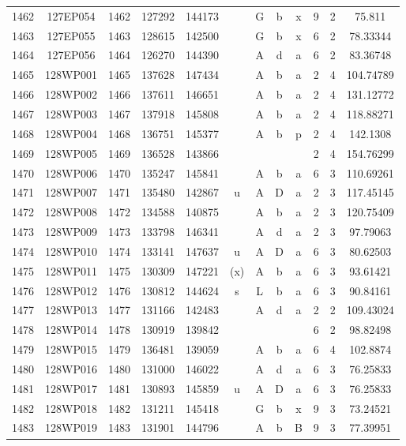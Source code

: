 \begin{tabular}{|*{12}{c|}}
1462 & 127EP054 & 1462 & 127292 & 144173 &  & G & b & x & 9 & 2 & 75.811 \\ 
1463 & 127EP055 & 1463 & 128615 & 142500 &  & G & b & x & 6 & 2 & 78.33344 \\ 
1464 & 127EP056 & 1464 & 126270 & 144390 &  & A & d & a & 6 & 2 & 83.36748 \\ 
1465 & 128WP001 & 1465 & 137628 & 147434 &  & A & b & a & 2 & 4 & 104.74789 \\ 
1466 & 128WP002 & 1466 & 137611 & 146651 &  & A & b & a & 2 & 4 & 131.12772 \\ 
1467 & 128WP003 & 1467 & 137918 & 145808 &  & A & b & a & 2 & 4 & 118.88271 \\ 
1468 & 128WP004 & 1468 & 136751 & 145377 &  & A & b & p & 2 & 4 & 142.1308 \\ 
1469 & 128WP005 & 1469 & 136528 & 143866 &  &  &  &  & 2 & 4 & 154.76299 \\ 
1470 & 128WP006 & 1470 & 135247 & 145841 &  & A & b & a & 6 & 3 & 110.69261 \\ 
1471 & 128WP007 & 1471 & 135480 & 142867 & u & A & D & a & 2 & 3 & 117.45145 \\ 
1472 & 128WP008 & 1472 & 134588 & 140875 &  & A & b & a & 2 & 3 & 120.75409 \\ 
1473 & 128WP009 & 1473 & 133798 & 146341 &  & A & d & a & 2 & 3 & 97.79063 \\ 
1474 & 128WP010 & 1474 & 133141 & 147637 & u & A & D & a & 6 & 3 & 80.62503 \\ 
1475 & 128WP011 & 1475 & 130309 & 147221 & (x) & A & b & a & 6 & 3 & 93.61421 \\ 
1476 & 128WP012 & 1476 & 130812 & 144624 & s & L & b & a & 6 & 3 & 90.84161 \\ 
1477 & 128WP013 & 1477 & 131166 & 142483 &  & A & d & a & 2 & 2 & 109.43024 \\ 
1478 & 128WP014 & 1478 & 130919 & 139842 &  &  &  &  & 6 & 2 & 98.82498 \\ 
1479 & 128WP015 & 1479 & 136481 & 139059 &  & A & b & a & 6 & 4 & 102.8874 \\ 
1480 & 128WP016 & 1480 & 131000 & 146022 &  & A & d & a & 6 & 3 & 76.25833 \\ 
1481 & 128WP017 & 1481 & 130893 & 145859 & u & A & D & a & 6 & 3 & 76.25833 \\ 
1482 & 128WP018 & 1482 & 131211 & 145418 &  & G & b & x & 9 & 3 & 73.24521 \\ 
1483 & 128WP019 & 1483 & 131901 & 144796 &  & A & b & B & 9 & 3 & 77.39951 \\ 

\end{tabular}
